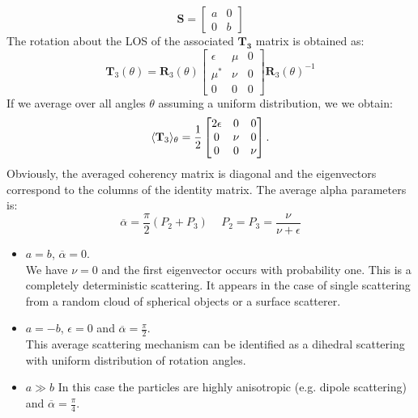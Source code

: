 \documentclass[11pt]{article}
\begin{document}
\begin{equation}
	\mathbf{S} = 
	\begin{bmatrix}
		a & 0\\
		0 & b
	\end{bmatrix}
\end{equation}
The rotation about the LOS of the associated $\mathbf{T_{3}}$ matrix is obtained as:
\begin{equation}
	\mathbf{T}_{3}\left(\theta\right) = \mathbf{R}_{3}\left(\theta\right)
	\begin{bmatrix}
		\epsilon & \mu & 0\\
		\mu^{*} & \nu  & 0\\
		0 & 0 & 0
	\end{bmatrix}
	 \mathbf{R}_{3}\left(\theta\right)^{-1}
\end{equation}
If we average over all angles $\theta$ assuming a uniform distribution, we we obtain:
\begin{equation}
	\langle\mathbf{T}_{3}\rangle_{\theta} = \frac{1}{2} 
	\begin{bmatrix}
		2\epsilon & 0 & 0\\
		0 & \nu & 0\\
		0 & 0 & \nu
	\end{bmatrix}.
\end{equation}
Obviously, the averaged coherency matrix is diagonal and the eigenvectors correspond to the columns of the identity matrix. The average alpha parameters is:
\begin{equation}
	\overline{\alpha} = \frac{\pi}{2} \left(P_{2} + P_{3}\right)\quad\, P_{2} = P_{3} = \frac{\nu}{\nu + \epsilon}
\end{equation}
\begin{itemize}
	\item $a = b$, $\overline{\alpha} = 0$.\\ We have $\nu = 0$ and the first eigenvector occurs with probability one. This is a completely deterministic scattering. It appears in the case of single scattering from a random cloud of spherical objects or a surface scatterer.
	\item $a = -b$, $\epsilon = 0$ and $\overline{\alpha} = \frac{\pi}{2}$.\\ This average scattering mechanism can be identified as a dihedral scattering with uniform distribution of rotation angles.
	\item $a \gg b$ In this case the particles are highly anisotropic (e.g. dipole scattering) and $\overline{\alpha} = \frac{\pi}{4}$.
\end{itemize}
\end{document}

